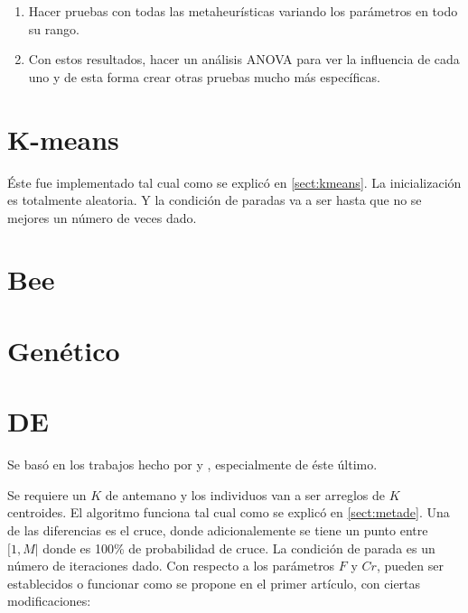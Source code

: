 \begin{enumerate}

\item Hacer pruebas con todas las metaheur\'isticas variando los par\'ametros 
en todo su rango.

\item Con estos resultados, hacer un an\'alisis ANOVA para ver la influencia de cada
uno y de esta forma crear otras pruebas mucho m\'as espec\'ificas.

\end{enumerate}

\section{K-means}  \label{chap:ikmeans}

\'Este fue implementado tal cual como se explic\'o en \ref{sect:kmeans}. La
inicializaci\'on es totalmente aleatoria. Y la condici\'on de paradas
va a ser hasta que no se mejores un n\'umero de veces dado.

\section{Bee}  \label{chap:ibee}

\section{Gen\'etico}  \label{chap:igenetico}

\section{DE}  \label{chap:ide}

Se bas\'o en los trabajos hecho por \cite{SwAjAm2008} y \cite{OmEnSa2005}, especialmente
de \'este \'ultimo.

Se requiere un $K$ de antemano y los individuos van a ser arreglos de $K$ centroides.
El algoritmo funciona tal cual como se explic\'o en \ref{sect:metade}. Una de las diferencias es
el cruce, donde adicionalemente se tiene
un punto entre $[1,M|$ donde es 100\% de probabilidad de cruce. La condici\'on
de parada es un n\'umero de iteraciones dado. Con respecto
a los par\'ametros $F$ y $Cr$, pueden ser establecidos o funcionar como se propone
en el primer art\'iculo, con ciertas modificaciones:

